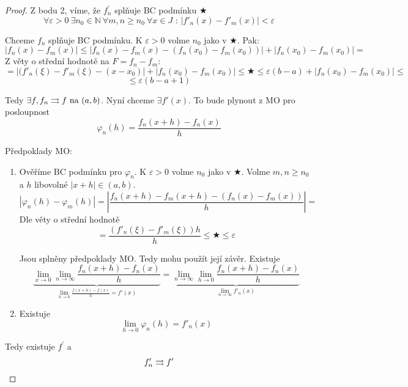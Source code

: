 \begin{proof}
Z bodu 2, víme, že $f^\prime_n$ splňuje BC podmínku $\bigstar$ 
$$\forall \varepsilon > 0 \ \exists n_0 \in \mathbb{N} \ \forall m,n \geq n_0 \ \forall x \in J \textrm{ : } |f'_n(x) - f'_m(x)| < \varepsilon $$

Chceme $f_n$ splňuje BC podmínku. K $\varepsilon > 0$ volme $n_0$ jako v $\bigstar$. Pak:
$$|f_n(x) - f_m(x)| \leq |f_n(x) - f_m(x) - (f_n(x_0) - f_m(x_0))| + |f_n(x_0) - f_m(x_0)| =$$
Z věty o střední hodnotě na $F = f_n - f_m$:
$$= |(f'_n(\xi) - f'_m(\xi) - (x-x_0)| + |f_n(x_0) - f_m(x_0)| \leq \bigstar \leq \varepsilon (b-a) + |f_n(x_0) - f_m(x_0)|\leq $$
$$\leq \varepsilon (b-a+1)$$

Tedy $\exists f, f_n \rightrightarrows f \textrm{ na } (a,b)$. Nyní chceme $\exists f'(x)$. To bude plynout z MO pro posloupnost 
$$\varphi_n (h) = \frac{f_n(x+h)-f_n(x)}{h}$$

Předpoklady MO:
\begin{enumerate}
\item Ověříme BC podmínku pro $\varphi_n$. K $\varepsilon > 0$ volme $n_0$ jako v $\bigstar$. Volme $m,n \geq n_0$ a $h$ libovolné $|x+h| \in (a,b)$.
$$|\varphi_n(h) - \varphi_m(h)| = \left| \frac{f_n(x+h) - f_m(x+h) - (f_n(x) - f_m(x))}{h} \right| = $$
Dle věty o střední hodnotě 
$$ = \frac{(f'_n(\xi) - f'_m(\xi)) h}{h}\leq \bigstar \leq \varepsilon $$

Jsou splněny předpoklady MO. Tedy mohu použít její závěr. Existuje
$$\underbrace{\lim_{x \to 0} \lim_{n \to \infty} \frac{f_n(x+h) - f_n(x)}{h}}_{\lim_{h \to 0} \frac{f(x+h) - f(x)}{h} = f'(x)} = \underbrace{\lim_{n \to \infty} \lim_{h \to 0} \frac {f_n(x+h) - f_n(x)}{h}}_{\lim_{n \to \infty} f'_n(x)}$$
\item Existuje
$$\lim_{h \to 0} \varphi_n(h) = f'_n(x)$$
\end{enumerate}
Tedy existuje $f^\prime$ a 
$$f'_n \rightrightarrows f' $$
\end{proof}
